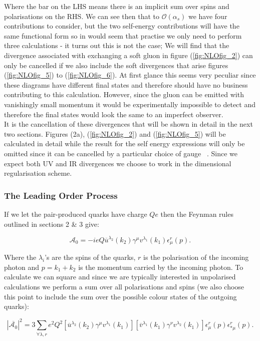 	Where the bar on the LHS means there is an implicit sum over spins and polarisations on the RHS.  We can see then that to
	$\mathcal{O}(\alpha_s)$ we have four contributions to consider, but the two self-energy contributions will have the same
	functional form so in would seem that practise we only need to perform three calculations - it turns out this is not the case;
	We will find that the divergence associated with exchanging a soft gluon in figure (\ref{fig:NLOfig_2}) can only be cancelled if we also
	include the soft divergences that arise figures (\ref{fig:NLOfig_5}) to (\ref{fig:NLOfig_6}).  At first glance this seems very peculiar since these diagrams
	have different final states and therefore should have no business contributing to this calculation.  However, since the gluon
	can be emitted with vanishingly small momentum it would be experimentally impossible to detect and therefore the final states
	would look the same to an imperfect observer.\\It is the cancellation of these divergences that will be shown in detail
	in the next two sections.  Figures (2a), (\ref{fig:NLOfig_2}) and (\ref{fig:NLOfig_5}) will be calculated in detail while the result for the self energy
	expressions will only be omitted since it can be cancelled by a particular choice of gauge ~\cite{field}.  Since we
	expect both UV and IR divergences we choose to work in the dimensional regularisation scheme.

	\subsubsection{The Leading Order Process}

	If we let the pair-produced quarks have charge $Qe$ then the Feynman rules outlined in sections 2 \& 3 give:

	\begin{equation}
	\mathcal{A}_0 = -ieQ\overline{u}^{\lambda_2}(k_2)\gamma^\mu v^{\lambda_1}(k_1)\epsilon^r_\mu(p).
	\end{equation}

	Where the $\lambda_i$'s are the spins of the quarks, $r$ is the polarisation of the incoming photon and $p = k_1 + k_2$ is
	the momentum carried by the incoming photon.  To calculate we can square and since we are typically interested in unpolarised
	calculations we perform a sum over all polarisations and spins (we also choose this point to include the sum over the possible
	colour states of the outgoing quarks):

	\begin{equation}
	|\overline{\mathcal{A}_0}|^2 = 3\sum_{\forall\lambda, r}e^2Q^2[\overline{u}^{\lambda_2}(k_2)\gamma^\mu
	v^{\lambda_1}(k_1)][\overline{v}^{\lambda_1}(k_1)\gamma^\nu v^{\lambda_2}(k_1)]\epsilon^r_\mu(p)\epsilon^r_{*\mu}(p).
	\end{equation}

